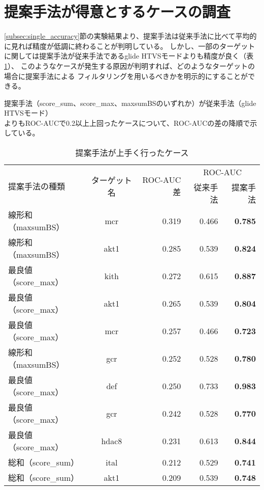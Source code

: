 \newpage

\section{提案手法が得意とするケースの調査}
\ref{subsec:single_accuracy}節の実験結果より、提案手法は従来手法に比べて平均的に見れば精度が低調に終わることが判明している。
しかし、一部のターゲットに関しては提案手法が従来手法であるglide HTVSモードよりも精度が良く（表\ref{table:target_accuracy_good}）、
このようなケースが発生する原因が判明すれば、どのようなターゲットの場合に提案手法による
フィルタリングを用いるべきかを明示的にすることができる。

\begin{table}[b] \centering
	\caption{提案手法が上手く行ったケース}
	\label{table:target_accuracy_good}
	提案手法（score\_sum、score\_max、maxsumBSのいずれか）が従来手法（glide HTVSモード）\\
	よりもROC-AUCで0.2以上上回ったケースについて、ROC-AUCの差の降順で示している。
	\begin{tabular}{lc|r|rr}
	\hline
	\multirow{2}{*}{提案手法の種類}	&\multirow{2}{*}{ターゲット名}	&\multirow{2}{*}{ROC-AUC差}	&\multicolumn{2}{c}{ROC-AUC}	\\
								&						&							&従来手法	&提案手法		\\ \hline
	線形和（maxsumBS）			&mcr					&0.319						&0.466		&{\bf 0.785}		\\
	線形和（maxsumBS）			&akt1					&0.285						&0.539		&{\bf 0.824}		\\
	最良値（score\_max）			&kith					&0.272						&0.615		&{\bf 0.887}		\\
	最良値（score\_max）			&akt1					&0.265						&0.539		&{\bf 0.804}		\\
	最良値（score\_max）			&mcr					&0.257						&0.466		&{\bf 0.723}		\\
	線形和（maxsumBS）			&gcr						&0.252						&0.528		&{\bf 0.780}		\\
	最良値（score\_max）			&def						&0.250						&0.733		&{\bf 0.983}		\\
	最良値（score\_max）			&gcr						&0.242						&0.528		&{\bf 0.770}		\\
	最良値（score\_max）			&hdac8					&0.231						&0.613		&{\bf 0.844}		\\
	総和（score\_sum）				&ital						&0.212						&0.529		&{\bf 0.741}		\\
	総和（score\_sum）				&akt1					&0.209						&0.539		&{\bf 0.748}		\\ \hline
	\end{tabular}
\end{table}

